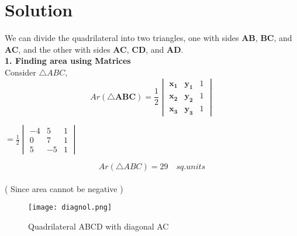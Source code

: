 \documentclass[journal,12pt,twocolumn]{IEEEtran}
\let\vec\mathbf
\begin{document}
\section{Solution}
\raggedright 
We can divide the quadrilateral into two triangles, one with sides \textbf{AB}, \textbf{BC}, and \textbf{AC}, and the other with sides \textbf{AC}, \textbf{CD}, and \textbf{AD}.\\
\vspace{0.2cm}
\textbf{1. Finding area using Matrices} \\
\vspace{0.25cm}
Consider $ \triangle ABC, $
\vspace{0.2cm}
\begin{equation}
Ar(\triangle \vec{ABC})= \frac{1}{2} \begin{vmatrix}
                    \vec{x_1} & \vec{y_1} & 1\\
                    \vec{x_2} & \vec{y_2} & 1\\
                    \vec{x_3} & \vec{y_3} & 1
                   \end{vmatrix} 
\end{equation} 
\begin{center}
$ = \frac{1}{2} \begin{vmatrix}
                    -4 & 5 & 1\\
                     0 & 7 & 1\\
                     5 & -5 & 1
                   \end{vmatrix} $ \\
                   \vspace{0.2cm}
\end{center}
\vspace{0.2cm}
\raggedright
\begin{equation}
Ar(\triangle ABC)= 29 \quad sq.units 
\end{equation}  
\\( Since area cannot be negative )

\begin{figure}[h]
\centering
\texttt{[image: diagnol.png]}
\centering
\caption{Quadrilateral ABCD with diagonal AC}
\end{figure}
\end{document}
